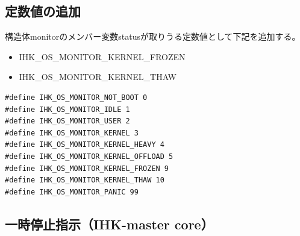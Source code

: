 \documentclass[twoside,11pt,fleqn]{book}
\begin{document}
{\subsection{定数値の追加}
構造体monitorのメンバー変数statusが取りうる定数値として下記を追加する。
\begin{itemize}
\item IHK\_OS\_MONITOR\_KERNEL\_FROZEN
\item IHK\_OS\_MONITOR\_KERNEL\_THAW
\end{itemize}
\begin{verbatim}
#define IHK_OS_MONITOR_NOT_BOOT 0
#define IHK_OS_MONITOR_IDLE 1
#define IHK_OS_MONITOR_USER 2
#define IHK_OS_MONITOR_KERNEL 3
#define IHK_OS_MONITOR_KERNEL_HEAVY 4
#define IHK_OS_MONITOR_KERNEL_OFFLOAD 5
#define IHK_OS_MONITOR_KERNEL_FROZEN 9
#define IHK_OS_MONITOR_KERNEL_THAW 10
#define IHK_OS_MONITOR_PANIC 99
\end{verbatim}
}


\subsection{一時停止指示（IHK-master core）}
\end{document}
